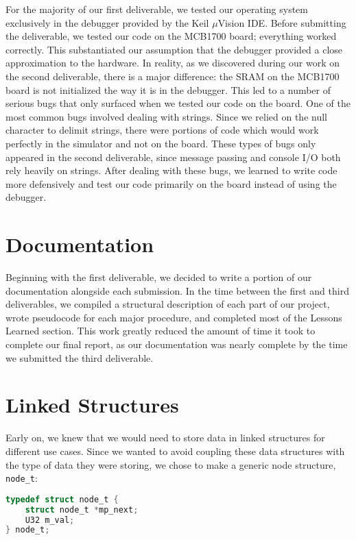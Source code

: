 \documentclass[12pt]{report}
\begin{document}
For the majority of our first deliverable, we tested our operating system exclusively in the debugger provided by the Keil $\mu$Vision IDE. Before submitting the deliverable, we tested our code on the MCB1700 board; everything worked correctly. This substantiated our assumption that the debugger provided a close approximation to the hardware. In reality, as we discovered during our work on the second deliverable, there is a major difference: the SRAM on the MCB1700 board is not initialized the way it is in the debugger. This led to a number of serious bugs that only surfaced when we tested our code on the board. One of the most common bugs involved dealing with strings. Since we relied on the null character to delimit strings, there were portions of code which would work perfectly in the simulator and not on the board. These types of bugs only appeared in the second deliverable, since message passing and console I/O both rely heavily on strings. After dealing with these bugs, we learned to write code more defensively and test our code primarily on the board instead of using the debugger.

\section{Documentation}

Beginning with the first deliverable, we decided to write a portion of our documentation alongside each submission. In the time between the first and third deliverables, we compiled a structural description of each part of our project, wrote pseudocode for each major procedure, and completed most of the Lessons Learned section. This work greatly reduced the amount of time it took to complete our final report, as our documentation was nearly complete by the time we submitted the third deliverable.

\section{Linked Structures}

Early on, we knew that we would need to store data in linked structures for different use cases. Since we wanted to avoid coupling these data structures with the type of data they were storing, we chose to make a generic node structure, \texttt{node_t}:

\begin{minipage}{\textwidth}
\begin{lstlisting}[language=C]
typedef struct node_t {
    struct node_t *mp_next;
    U32 m_val;
} node_t;
\end{lstlisting}
\end{minipage}
\end{document}
